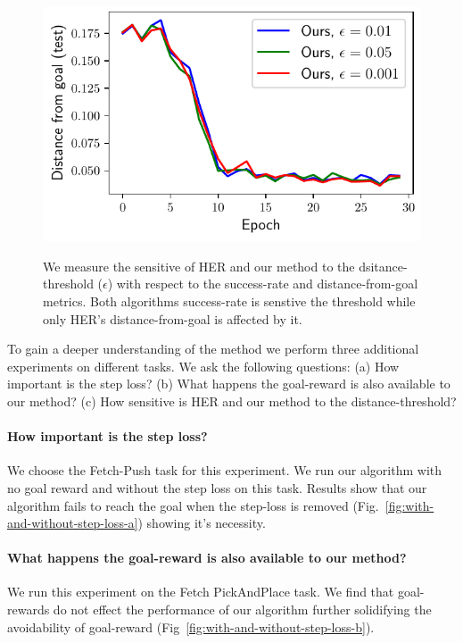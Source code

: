 \begin{figure}
\begin{minipage}[b]{\frac\linewidth}
  \includegraphics[width=\frac\columnwidth]{media/res/ablate-ddpg-dqst-low_tresh_chosen-low_thresh_alt-dqst/0.001-FetchPushPR-be467dfepoch-test/ag_g_dist.pdf}%
  \label{fig:distance}
\end{minipage}
  \caption{We measure the sensitive of HER and our method to the
    dsitance-threshold ($\epsilon$) with respect to the success-rate
    and distance-from-goal metrics. Both algorithms success-rate is
    senstive the threshold while only HER's distance-from-goal is
    affected by it. 
}%
  \label{fig:with-different-distance-thresholds}%
\end{figure}%
% 

To gain a deeper understanding of the method we perform three additional
experiments on different tasks. We ask the following questions:
(a) How important is the step loss?
(b) What happens the goal-reward is also available to our method?
(c) How sensitive is HER and our method to the distance-threshold?
\paragraph{How important is the step loss?}
%
We choose the Fetch-Push task for this experiment.
We run our algorithm with no goal reward and without the step loss on
this task. Results show that our algorithm fails to reach the goal when the
step-loss is removed (Fig.~\ref{fig:with-and-without-step-loss-a})
showing it's necessity.

\paragraph{What happens the goal-reward is also available to our method?}
We run this experiment on the Fetch PickAndPlace task. We find that
goal-rewards do not effect the performance of our algorithm further
solidifying the avoidability of goal-reward
(Fig~\ref{fig:with-and-without-step-loss-b}).

